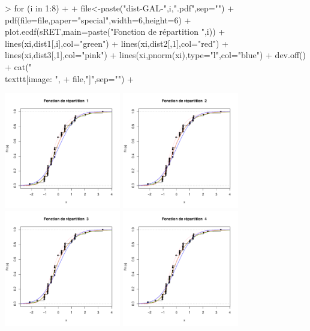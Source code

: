 \documentclass{report}
\begin{document}
\begin{Schunk}
\begin{Sinput}
> 	for (i in 1:8)
+ 	{
+ 		file<-paste("dist-GAL-",i,".pdf",sep="")
+ 		pdf(file=file,paper="special",width=6,height=6)
+ 		plot.ecdf(sRET,main=paste("Fonction de répartition ",i))
+ 		lines(xi,dist1[,i],col="green")
+ 		lines(xi,dist2[,1],col="red")
+ 		lines(xi,dist3[,1],col="pink")
+ 		lines(xi,pnorm(xi),type="l",col="blue")
+ 		dev.off()
+ 		cat("\\texttt{[image: ",
+ 				file,"]}\n",sep="")
+ 	}
\end{Sinput}
\includegraphics[height=2in,width=2in]{dist-GAL-1.pdf}
\includegraphics[height=2in,width=2in]{dist-GAL-2.pdf}
\includegraphics[height=2in,width=2in]{dist-GAL-3.pdf}
\includegraphics[height=2in,width=2in]{dist-GAL-4.pdf}

\end{Schunk}
\end{document}
